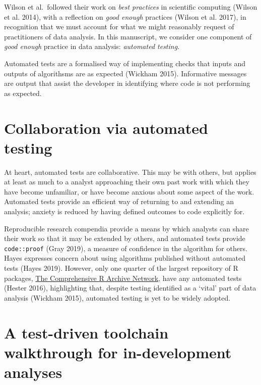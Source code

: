 \documentclass[
]{article}
\begin{document}
Wilson et al.~followed their work on \emph{best practices} in scientific
computing (Wilson et al. 2014), with a reflection on \emph{good enough}
practices (Wilson et al. 2017), in recognition that we must account for
what we might reasonably request of practitioners of data analysis. In
this manuscript, we consider one component of \emph{good enough}
practice in data analysis: \emph{automated testing}.

Automated tests are a formalised way of implementing checks that inputs
and outputs of algorithsms are as expected (Wickham 2015). Informative
messages are output that assist the developer in identifying where code
is not performing as expected.

\hypertarget{collaboration-via-automated-testing}{%
\section{Collaboration via automated
testing}\label{collaboration-via-automated-testing}}

At heart, automated tests are collaborative. This may be with others,
but applies at least as much to a analyst approaching their own past
work with which they have become unfamiliar, or have become anxious
about some aspect of the work. Automated tests provide an efficient way
of returning to and extending an analysis; anxiety is reduced by having
defined outcomes to code explicitly for.

Reproducible research compendia provide a means by which analysts can
share their work so that it may be extended by others, and automated
tests provide \texttt{code::proof} (Gray 2019), a measure of confidence
in the algorithm for others. Hayes expresses concern about using
algorithms published without automated tests (Hayes 2019). However, only
one quarter of the largest repository of R packages,
\href{https://cran.r-project.org/}{The Comprehensive R Archive Network},
have any automated tests (Hester 2016), highlighting that, despite
testing identified as a `vital' part of data analysis (Wickham 2015),
automated testing is yet to be widely adopted.

\hypertarget{a-test-driven-toolchain-walkthrough-for-in-development-analyses}{%
\section{A test-driven toolchain walkthrough for in-development
analyses}\label{a-test-driven-toolchain-walkthrough-for-in-development-analyses}}
\end{document}
